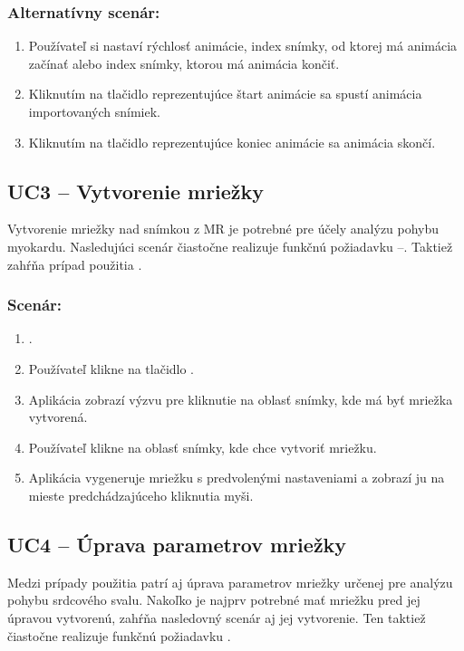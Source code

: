 \clearpage

\subsubsection*{Alternatívny scenár:}
\begin {enumerate}
\item [\textbf{2.}] {Používateľ si nastaví rýchlosť animácie, index snímky, od ktorej má animácia začínať alebo index snímky, ktorou má animácia končiť.}
\item  [\textbf{3.}] {Kliknutím na tlačidlo reprezentujúce štart animácie sa spustí animácia importovaných snímiek.}
\item  [\textbf{4.}] {Kliknutím na tlačidlo reprezentujúce koniec animácie sa animácia skončí.}
\end {enumerate}

\subsection {UC3 -- Vytvorenie mriežky}\label{uc3}
Vytvorenie mriežky nad snímkou z MR je potrebné pre účely analýzu pohybu myokardu. Nasledujúci scenár čiastočne realizuje funkčnú požiadavku --\newline {}. Taktiež zahŕňa prípad použitia .

\subsubsection*{Scenár:}
\begin {enumerate}
\item {.}
\item {Používateľ klikne na tlačidlo .}
\item {Aplikácia zobrazí výzvu pre kliknutie na oblasť snímky, kde má byť mriežka vytvorená.}
\item {Používateľ klikne na oblasť snímky, kde chce vytvoriť mriežku.}
\item {Aplikácia vygeneruje mriežku s predvolenými nastaveniami a zobrazí ju na mieste predchádzajúceho kliknutia myši.}
\end {enumerate}

\subsection {UC4 -- Úprava parametrov mriežky}\label{uc4}
Medzi prípady použitia patrí aj úprava parametrov mriežky určenej pre analýzu pohybu srdcového svalu. Nakoľko je najprv potrebné mať mriežku pred jej úpravou vytvorenú, zahŕňa nasledovný scenár aj jej vytvorenie. Ten taktiež čiastočne realizuje funkčnú požiadavku .

